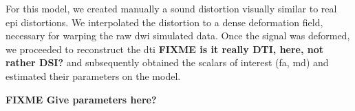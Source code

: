 For this model, we created manually a sound distortion visually similar
to real \ac{epi} distortions. We interpolated the distortion to a 
dense deformation field, necessary for warping the raw \ac{dwi} simulated
data. Once the signal was deformed, we proceeded to reconstruct the
\ac{dti} \textbf{FIXME is it really DTI, here, not rather DSI?} and subsequently obtained the scalars of interest (\ac{fa}, \ac{md}) and estimated their parameters on the model.

\textbf{FIXME Give parameters here?}\\
